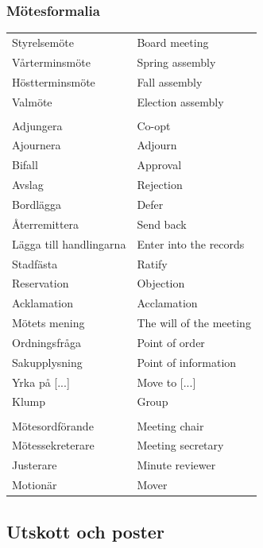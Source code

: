 \documentclass{dsekprotokoll}
\begin{document}
\subsubsection*{Mötesformalia}
\begin{center}
    \begin{tabular}{R{6.5cm}|L{6.5cm}}
        Styrelsemöte & Board meeting\\
        Vårterminsmöte & Spring assembly\\
        Höstterminsmöte & Fall assembly\\
        Valmöte & Election assembly\\
        \\

        Adjungera & Co-opt\\
        Ajournera & Adjourn\\
        Bifall & Approval\\
        Avslag & Rejection\\
        Bordlägga & Defer\\
        Återremittera & Send back\\
        Lägga till handlingarna & Enter into the records\\
        Stadfästa & Ratify\\
        Reservation & Objection\\
        Acklamation & Acclamation\\
        Mötets mening & The will of the meeting\\
        Ordningsfråga & Point of order\\
        Sakupplysning & Point of information\\
        Yrka på [...] & Move to [...]\\
        Klump & Group\\
        \\

        Mötesordförande & Meeting chair\\
        Mötessekreterare & Meeting secretary\\
        Justerare & Minute reviewer\\
        Motionär & Mover\\
    \end{tabular}
\end{center}

\pagebreak
\subsection{Utskott och poster}
\end{document}
